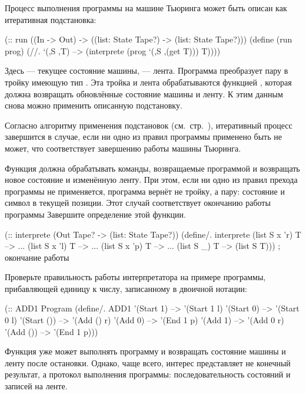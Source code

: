 Процесс выполнения программы на машине Тьюринга может быть описан как итеративная подстановка:
\begin{Definition}[emph={S,T,prog}]
(:: run ((In -> Out) -> ((list: State Tape?) -> 
                         (list: State Tape?)))
  (define (run prog)
    (//. `(,S ,T) --> (interprete (prog `(,S ,(get T))) T))))
\end{Definition}

\newpage
Здесь  --- текущее состояние машины,  --- лента. Программа  преобразует пару  в тройку имеющую тип . Эта тройка и лента обрабатываются функцией , которая должна  возвращать обновлённые состояние машины и ленту. К этим данным снова можно применить описанную подстановку. 

Согласно алгоритму применения подстановок (см.~стр.~\pageref{rewriting-semantics}), итеративный процесс завершится в случае, если ни одно из правил программы применено быть не может, что соответствует завершению работы машины Тьюринга.

\begin{Assignment}
  Функция  должна обрабатывать команды, возвращаемые программой и возвращать новое состояние и изменённую ленту. При этом, если ни одно из правил прехода программы не применяется, программа вернёт не тройку, а пару: состояние и символ в текущей позиции. Этот случай соответствует окончанию работы программы
Завершите определение этой функции.
\begin{SchemeCode}[emph={S,T,v}]
(:: interprete (Out Tape? -> (list: State Tape?))
  (define/. interprete
    (list S x 'r) T --> ...
    (list S x 'l) T --> ...
    (list S x 'p) T --> ...
    (list S _) T --> (list S T))) ; окончание работы
\end{SchemeCode}

Проверьте правильность работы интерпретатора на примере программы, прибавляющей единицу к числу, записанному в двоичной нотации:
\begin{SchemeCode}
(:: ADD1 Program
  (define/. ADD1
    '(Start 1) --> '(Start 1 l) 
    '(Start 0) --> '(Start 0 l) 
    '(Start ()) --> '(Add () r) 
    '(Add 0) --> '(End 1 p) 
    '(Add 1) --> '(Add 0 r) 
    '(Add ()) --> '(End 1 p)))
\end{SchemeCode}
\end{Assignment}

Функция  уже может выполнять программу и возвращать состояние машины и ленту после остановки. Однако, чаще всего, интерес представляет не конечный результат, а протокол выполнения программы: последовательность состояний и записей на ленте.

